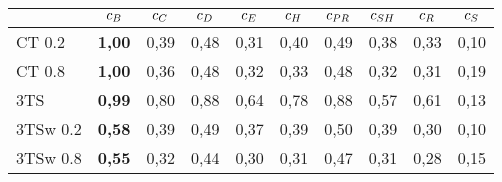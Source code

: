 \begin{tabular}[ht]{l|c|c|c|c|c|c|c|c|c}
\hline
\hline
	& $c_{B}$	& $c_{C}$	& $c_{D}$	& $c_{E}$ & $c_{H}$	& $c_{PR}$ & $c_{SH}$ & $c_{R}$ & $c_{S}$\\
	\hline
CT 0.2	 & \textbf{1,00} & 0,39 & 0,48 & 0,31 & 0,40 & 0,49 & 0,38 & 0,33 & 0,10\\
CT 0.8	 & \textbf{1,00} & 0,36 & 0,48 & 0,32 & 0,33 & 0,48 & 0,32 & 0,31 & 0,19\\
3TS		 & \textbf{0,99} & 0,80 & 0,88 & 0,64 & 0,78 & 0,88 & 0,57 & 0,61 & 0,13\\
3TSw 0.2 & \textbf{0,58} & 0,39 & 0,49 & 0,37 & 0,39 & 0,50 & 0,39 & 0,30 & 0,10\\
3TSw 0.8 & \textbf{0,55} & 0,32 & 0,44 & 0,30 & 0,31 & 0,47 & 0,31 & 0,28 & 0,15\\
\hline
\hline
\end{tabular}
